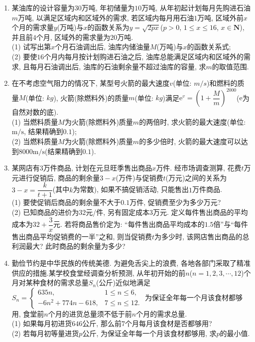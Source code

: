 \documentclass[10pt,a4paper]{article}
\begin{document}
\begin{enumerate}[1.]

\item 某油库的设计容量为$30$万吨, 年初储量为$10$万吨, 从年初起计划每月先购进石油$m$万吨, 以满足区域内和区域外的需求, 若区域内每月用石油$1$万吨, 区域外前$x$个月的需求量$y$(万吨)与$x$的函数关系为$y=\sqrt {2px}$($p>0$, $1\le x\le 16$, $x\in \mathbf{N}$), 并且前$4$个月, 区域外的需求量为$20$万吨.\\
(1) 试写出第$x$个月石油调出后, 油库内储油量$M$(万吨)与$x$的函数关系式;\\
(2) 要使$16$个月内每月按计划购进石油之后, 油库总能满足区域内和区域外的需求, 且每月石油调出后, 油库的石油剩余量不超过油库的容量, 求$m$的取值范围.

\item 在不考虑空气阻力的情况下, 某型号火箭的最大速度$v$(单位: $m/s$)和燃料的质量$M$(单位: $kg$), 火箭(除燃料外)的质量$m$(单位: $kg$)满足$\mathrm{e}^v=(1+\dfrac Mm)^{2000}$($\mathrm{e}$为自然对数的底).\\
(1) 当燃料质量$M$为火箭(除燃料外)质量$m$的两倍时, 求火箭的最大速度(单位: $\text{m}/\text{s}$, 结果精确到$0.1$);\\
(2) 当燃料质量$M$为火箭(除燃料外)质量$m$的多少倍时, 火箭的最大速度可以达到$8000\text{m}/\text{s}$(结果精确到$0.1$).

\item 某网店有$3$万件商品, 计划在元旦旺季售出商品$x$万件. 经市场调查测算, 花费$t$万元进行促销后, 商品的剩余量$3-x$(万件)与促销费$t$(万元)之间的关系为$3-x=\dfrac k{t+1}$(其中$k$为常数), 如果不搞促销活动, 只能售出$1$万件商品.\\
(1) 要使促销后商品的剩余量不大于$0.1$万件, 促销费至少为多少万元?\\
(2) 已知商品的进价为$32$元/件, 另有固定成本$3$万元. 定义每件售出商品的平均成本为$32+\dfrac 3x$元. 若将商品售价定为: ``每件售出商品平均成本的$1.5$倍''与``每件售出商品平均促销费的一半''之和, 则当促销费$t$为多少时, 该网店售出商品的总利润最大? 此时商品的剩余量为多少?

\item 勤俭节约是中华民族的传统美德. 为避免舌尖上的浪费, 各地各部门采取了精准供应的措施.某学校食堂经调查分析预测, 从年初开始的前$n$($n=1,2,3,\cdots ,12$)个月对某种食材的需求总量$S_n$(公斤)近似地满足$S_n=\begin{cases}   635n, & 1\le n\le 6,\\ -6n^2+774n-618, & 7\le n\le 12.  \end{cases}$ 为保证全年每一个月该食材都够用, 食堂前$n$个月的进货总量须不低于前$n$个月的需求总量.\\
(1) 如果每月初进货$646$公斤, 那么前$7$个月每月该食材是否都够用?\\
(2) 若每月初等量进货$p$公斤, 为保证全年每一个月该食材都够用, 求$p$的最小值.


\end{enumerate}
\end{document}
